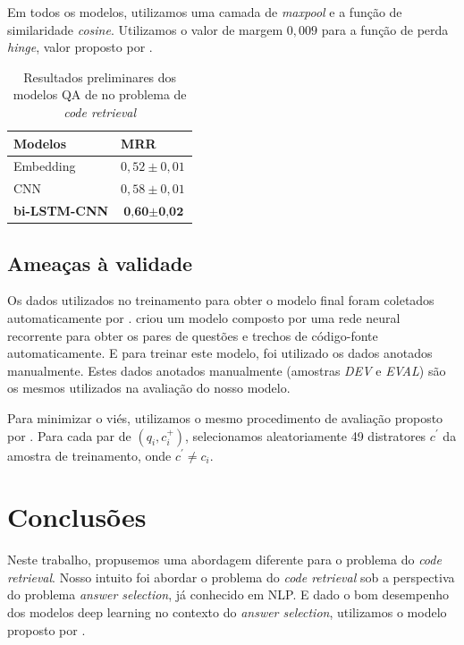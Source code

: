 \documentclass[12pt]{article}
\begin{document}
Em todos os modelos, utilizamos uma camada de \textit{maxpool} e a função de similaridade \textit{cosine}. Utilizamos o valor de margem $0,009$ para a função de perda \textit{hinge}, valor proposto por \cite{feng-answer-selection-2015}.


\begin{table}[h]
\centering
\begin{tabular}{ |p{3cm}|p{3cm}|  }
 \hline
 \textbf{Modelos} & \textbf{MRR}\\
 \hline
 Embedding & $0,52 \pm 0,01$\\
 \hline
 CNN & $0,58 \pm 0,01 $ \\
 \hline
 \textbf{bi-LSTM-CNN} & $\textbf{0,60} \pm \textbf{0,02}$\\
 \hline
\end{tabular}
\caption{Resultados preliminares dos modelos QA de \cite{tan-lstm-qa} no problema de \textit{code retrieval}}
\label{table:resultados-preliminares}
\end{table}

\subsection{Ameaças à validade}

Os dados utilizados no treinamento para obter o modelo final foram coletados automaticamente por \cite{Yao-staqc:2018}. \cite{Yao-staqc:2018} criou um modelo composto por uma rede neural recorrente para obter os pares de questões e trechos de código-fonte automaticamente. E para treinar este modelo, foi utilizado os dados anotados manualmente. Estes dados anotados manualmente (amostras \emph{DEV} e \emph{EVAL}) são os mesmos utilizados na avaliação do nosso modelo. 

Para minimizar o viés, utilizamos o mesmo procedimento de avaliação proposto por \cite{iyer-etal-2016-summarizing}. Para cada par de $(q_{i}, c_{i}^{+})$, selecionamos aleatoriamente 49 distratores $c^{'}$ da amostra de treinamento, onde $c^{'} \neq c_{i}$. 

\section{Conclusões}\label{sec:conclusao}

Neste trabalho, propusemos uma abordagem diferente para o problema do \textit{code retrieval}. Nosso intuito foi abordar o problema do \textit{code retrieval} sob a perspectiva do problema \textit{answer selection}, já conhecido em NLP. E dado o bom desempenho dos modelos deep learning no contexto do \textit{answer selection}, utilizamos o modelo proposto por \cite{tan-lstm-qa}.
\end{document}

